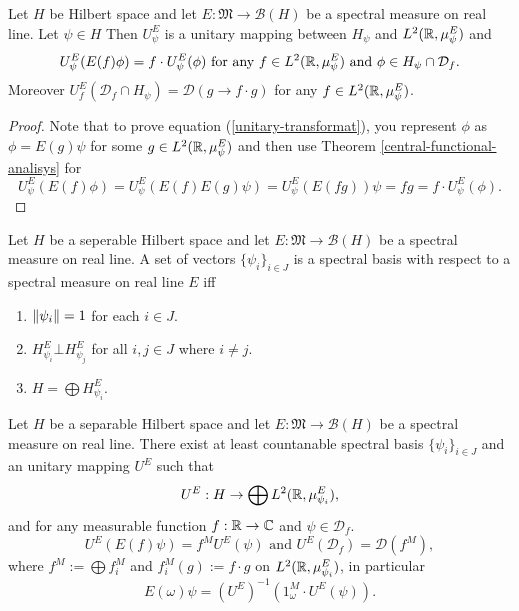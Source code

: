 \documentclass[main.tex]{subfiles}
\begin{document}
\begin{theorem}
Let $H$ be Hilbert space and let $E:\mathfrak{M}\to \mathcal{B}(H)$ be a spectral measure on real line. Let $\psi\in H$ Then $U_\psi^E$ is a unitary mapping between $H_\psi$ and $L^2(\mathbb{R}, \mu^E_\psi)$ and 
\begin{equation}
\label{unitary-transformat}
U_\psi^E(E(f)\phi) = f\cdot U_\psi^E(\phi) \text{ for any } f\in L^2(\mathbb{R}, \mu^E_\psi) \text{ and } \phi\in H_\psi\cap\mathcal{D}_f.
\end{equation}
Moreover $U^E_f(\mathcal{D}_f \cap H_\psi) = \mathcal{D}(g \to f\cdot g)$ for any $f\in L^2(\mathbb{R}, \mu^E_\psi)$.
\end{theorem}
\begin{proof}
\cite[see][The Spectral Theorem]{teschl2014}
Note that to prove equation (\ref{unitary-transformat}), 
you represent $\phi$ as $\phi=E(g)\psi$ 
for some $g\in L^2(\mathbb{R}, \mu^E_\psi)$ and then use Theorem \ref{central-functional-analisys} for
\begin{equation}
U_\psi^E(E(f)\phi) = U_\psi^E(E(f)E(g)\psi) = U_\psi^E(E(fg))\psi = fg = f\cdot U_\psi^E(\phi).
\end{equation}
\end{proof}
\begin{definition}
Let $H$ be a seperable Hilbert space and let $E:\mathfrak{M}\to \mathcal{B}(H)$ be a spectral measure on real line.
A set of vectors $\{\psi_i\}_{i\in J}$ is a spectral basis with respect to a spectral measure on real line $E$ iff
\begin{enumerate}
\item $\norm{\psi_i} = 1$ for each $i\in J$.
\item $H^E_{\psi_i} \bot H^E_{\psi_j}$ for all $i, j\in J$ where $i\not=j$.
\item $H = \bigoplus H^E_{\psi_i}$.  
\end{enumerate} 
\end{definition}
\begin{theorem}
Let $H$ be a separable Hilbert space and let $E:\mathfrak{M}\to \mathcal{B}(H)$ be a spectral measure on real line. There exist at least countanable spectral basis $\{\psi_i\}_{i\in J}$ and an unitary mapping $U^E$ such that
\begin{equation}
U^E: H \to \bigoplus L^2(\mathbb{R}, \mu^E_{\psi_{i}}),
\end{equation}
and
for any measurable function $f:\mathbb{R}\to\mathbb{C}$ and $\psi\in \mathcal{D}_f$.
\begin{equation}
U^E(E(f)\psi) = f^{M}U^E(\psi) \text{ and } U^E(\mathcal{D}_f) = \mathcal{D}(f^M),
\end{equation}
where $f^M := \bigoplus f_i^M$ and $f_i^M(g):= f\cdot g$ on $L^2(\mathbb{R}, \mu^E_{\psi_{i}})$, 
in particular
\begin{equation}
\label{spectral-measure-reconstruction}
E(\omega)\psi = (U^E)^{-1}(1^M_\omega \cdot U^E(\psi)).
\end{equation}
\end{theorem}
\end{document}
